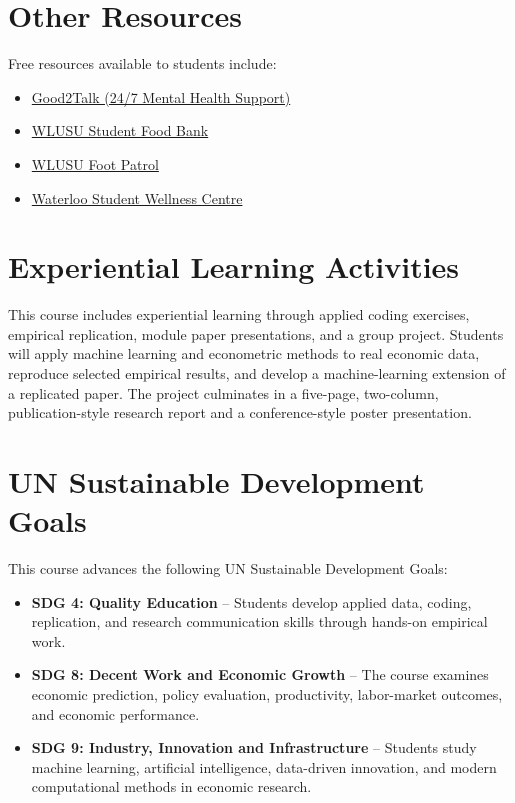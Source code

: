 \documentclass[11pt]{article}
\newcommand{\coloredsection}[1]{%
    \section*{\large\textcolor{sectioncolor}{#1}}%
}
\begin{document}
\coloredsection{Other Resources}

Free resources available to students include:
\begin{itemize}
    \item \href{https://good2talk.ca/}{Good2Talk (24/7 Mental Health Support)}
    \item \href{https://www.yourstudentsunion.ca/food-bank}{WLUSU Student Food Bank}
    \item \href{https://students.wlu.ca/wellness-and-recreation/safety/foot-patrol.html}{WLUSU Foot Patrol}
    \item \href{https://students.wlu.ca/wellness-and-recreation/health-and-wellness/index.html}{Waterloo Student Wellness Centre}
\end{itemize}



\coloredsection{Experiential Learning Activities}

This course includes experiential learning through applied coding exercises, empirical replication, module paper presentations, and a group project. Students will apply machine learning and econometric methods to real economic data, reproduce selected empirical results, and develop a machine-learning extension of a replicated paper. The project culminates in a five-page, two-column, publication-style research report and a conference-style poster presentation.

\coloredsection{UN Sustainable Development Goals}

This course advances the following UN Sustainable Development Goals:

\begin{itemize}
    \item \textbf{SDG 4: Quality Education} -- Students develop applied data, coding, replication, and research communication skills through hands-on empirical work.
    \item \textbf{SDG 8: Decent Work and Economic Growth} -- The course examines economic prediction, policy evaluation, productivity, labor-market outcomes, and economic performance.
    \item \textbf{SDG 9: Industry, Innovation and Infrastructure} -- Students study machine learning, artificial intelligence, data-driven innovation, and modern computational methods in economic research.
\end{itemize}
\end{document}
